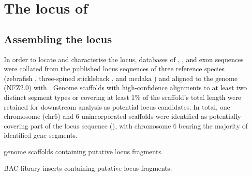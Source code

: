 \section{The \igh{} locus of \nfu}
\label{sec:nfu-locus}

\subsection{Assembling the \Nfu \igh{} locus}
\label{sec:nfu-locus-assembly}

In order to locate and characterise the \nfu \igh{} locus, databases of \vh, \jh, and \ch exon sequences were collated from the published locus sequences of three reference species (zebrafish \parencite{danilova2005zebrafish}, three-spined stickleback \parencite{bao2010stickleback,gambondeza2011stickleback}, and medaka \parencite{magadan2011medaka}) and aligned to the \nfu genome (NFZ2.0) with  \parencite{altschul1990blast,altschul1997blast}. Genome scaffolds with high-confidence alignments to at least two distinct segment types or covering at least 1\% of the scaffold's total length were retained for downstream analysis as potential locus candidates. In total, one chromosome (chr6) and 6 unincorporated scaffolds were identified as potentially covering part of the locus sequence (), with chromosome 6 bearing the majority of identified gene segments.  %

\begin{table}[bh]
\centering
\caption{\Nfu genome scaffolds containing putative \igh{} locus fragments.}
\begin{threeparttable}

\end{threeparttable}
\label{tab:nfu-locus-scaffolds}
\end{table}

\begin{table}[bh]
\centering
\caption{\Nfu BAC-library inserts containing putative \igh{} locus fragments.}
\begin{threeparttable}

\end{threeparttable}
\label{tab:nfu-locus-bacs}
\end{table}

